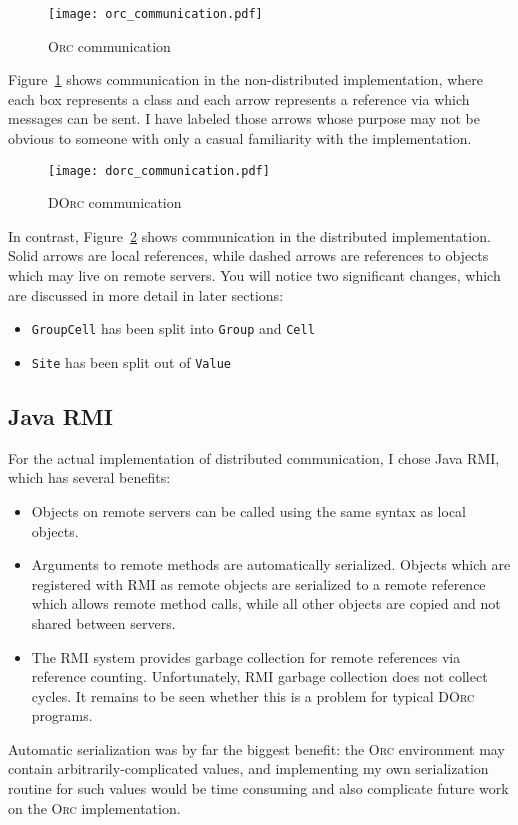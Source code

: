 \documentclass[10pt,letterpaper]{article}
\begin{document}
\begin{figure}[t]
\begin{center}
\texttt{[image: orc\_communication.pdf]}
\end{center}
\caption{\textsc{Orc} communication}
\label{fig:orc_communication}
\end{figure}

Figure~\ref{fig:orc_communication} shows communication in the non-distributed
implementation, where each box represents a class and each arrow represents a
reference via which messages can be sent. I have labeled those arrows whose
purpose may not be obvious to someone with only a casual familiarity with the
implementation.

\begin{figure}[t]
\begin{center}
\texttt{[image: dorc\_communication.pdf]}
\end{center}
\caption{\textsc{DOrc} communication}
\label{fig:dorc_communication}
\end{figure}

In contrast, Figure~\ref{fig:dorc_communication} shows communication in the
distributed implementation. Solid arrows are local references, while dashed
arrows are references to objects which may live on remote servers. You will
notice two significant changes, which are discussed in more detail in later
sections:
\begin{itemize}
\item \texttt{GroupCell} has been split into \texttt{Group} and \texttt{Cell}
\item \texttt{Site} has been split out of \texttt{Value}
\end{itemize}

\subsection{Java RMI}

For the actual implementation of distributed communication, I chose Java RMI,
which has several benefits:
\begin{itemize}
\item Objects on remote servers can be called using the same syntax as local
objects.
\item Arguments to remote methods are automatically serialized. Objects which
are registered with RMI as remote objects are serialized to a remote reference
which allows remote method calls, while all other objects are copied and not
shared between servers.
\item The RMI system provides garbage collection for remote references via
reference counting. Unfortunately, RMI garbage collection does not collect
cycles. It remains to be seen whether this is a problem for typical
\textsc{DOrc} programs.
\end{itemize}
Automatic serialization was by far the biggest benefit: the \textsc{Orc}
environment may contain arbitrarily-complicated values, and implementing my own
serialization routine for such values would be time consuming and also
complicate future work on the \textsc{Orc} implementation.
\end{document}
